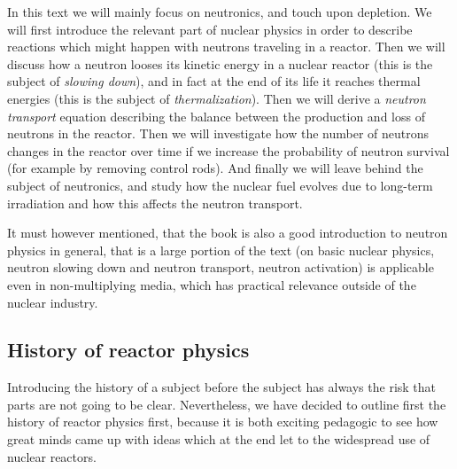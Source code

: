 In this text we will mainly focus on neutronics, and touch upon depletion. We will first introduce the relevant part of nuclear physics in order to describe reactions which might happen with neutrons traveling in a reactor. Then we will discuss how a neutron looses its kinetic energy in a nuclear reactor (this is the subject of \textit{slowing down}), and in fact at the end of its life it reaches thermal energies (this is the subject of \textit{thermalization}). Then we will derive a \textit{neutron transport} equation describing the balance between the production and loss of neutrons in the reactor. Then we will investigate how the number of neutrons changes in the reactor over time if we increase the probability of neutron survival (for example by removing control rods). And finally we will leave behind the subject of neutronics, and study how the nuclear fuel evolves due to long-term irradiation and how this affects the neutron transport.

It must however mentioned, that the book is also a good introduction to neutron physics in general, that is a large portion of the text (on basic nuclear physics, neutron slowing down and neutron transport, neutron activation) is applicable even in non-multiplying media, which has practical relevance outside of the nuclear industry.  

\subsection{History of reactor physics}

Introducing the history of a subject before the subject has always the risk that parts are not going to be clear. Nevertheless, we have decided to outline first the history of reactor physics first, because it is both exciting pedagogic to see how great minds came up with ideas which at the end let to the widespread use of nuclear reactors.

